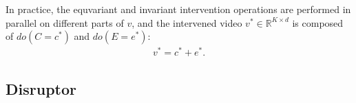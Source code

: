 In practice, the equvariant and invariant intervention operations are performed in parallel on different parts of $v$, and the intervened video $v^* \in \mathbb{R}^{K\times d}$ is composed of $do(C=c^*)$ and $do(E=e^*)$:
\begin{gather}
    v^*=c^*+e^*.
\end{gather}


% 
\subsection{Disruptor}


